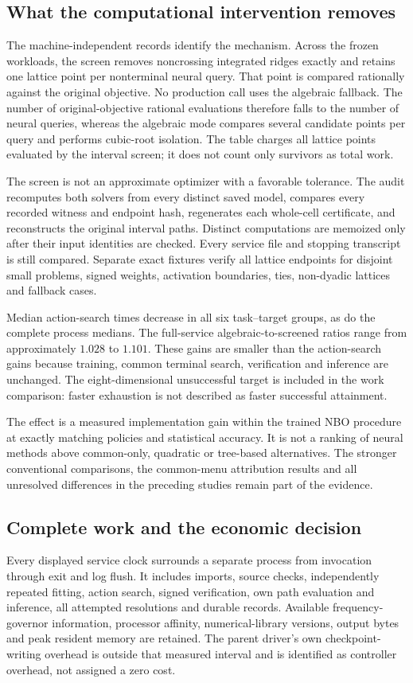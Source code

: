 \subsection{What the computational intervention removes}

The machine-independent records identify the mechanism. Across the frozen workloads, the screen removes noncrossing integrated ridges exactly and retains one lattice point per nonterminal neural query. That point is compared rationally against the original objective. No production call uses the algebraic fallback. The number of original-objective rational evaluations therefore falls to the number of neural queries, whereas the algebraic mode compares several candidate points per query and performs cubic-root isolation. The table charges all lattice points evaluated by the interval screen; it does not count only survivors as total work.

The screen is not an approximate optimizer with a favorable tolerance. The audit recomputes both solvers from every distinct saved model, compares every recorded witness and endpoint hash, regenerates each whole-cell certificate, and reconstructs the original interval paths. Distinct computations are memoized only after their input identities are checked. Every service file and stopping transcript is still compared. Separate exact fixtures verify all lattice endpoints for disjoint small problems, signed weights, activation boundaries, ties, non-dyadic lattices and fallback cases.

Median action-search times decrease in all six task--target groups, as do the complete process medians. The full-service algebraic-to-screened ratios range from approximately $1.028$ to $1.101$. These gains are smaller than the action-search gains because training, common terminal search, verification and inference are unchanged. The eight-dimensional unsuccessful target is included in the work comparison: faster exhaustion is not described as faster successful attainment.

The effect is a measured implementation gain within the trained NBO procedure at exactly matching policies and statistical accuracy. It is not a ranking of neural methods above common-only, quadratic or tree-based alternatives. The stronger conventional comparisons, the common-menu attribution results and all unresolved differences in the preceding studies remain part of the evidence.

\subsection{Complete work and the economic decision}
Every displayed service clock surrounds a separate process from invocation through exit and log flush. It includes imports, source checks, independently repeated fitting, action search, signed verification, own path evaluation and inference, all attempted resolutions and durable records. Available frequency-governor information, processor affinity, numerical-library versions, output bytes and peak resident memory are retained. The parent driver's own checkpoint-writing overhead is outside that measured interval and is identified as controller overhead, not assigned a zero cost.

